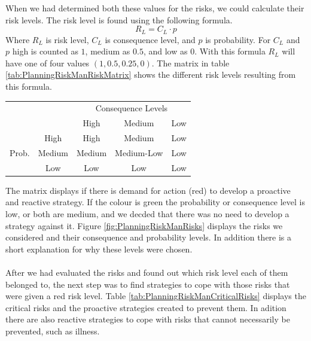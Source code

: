 When we had determined both these values for the risks, we could calculate their risk levels. The risk level is found using the following formula.
\begin{equation}
R_L = C_L \cdot p
\end{equation}
Where \( R_L \) is risk level, \( C_L \) is consequence level, and \( p \) is probability. For \( C_L \) and \( p \) high is counted as \( 1 \), medium as \( 0.5 \), and low as \( 0 \). With this formula \( R_L \) will have one of four values \( (1, 0.5, 0.25, 0) \). The matrix in table \ref{tab:PlanningRiskManRiskMatrix} shows the different risk levels resulting from this formula.

\begin{minipage}{\linewidth}
\centering
\begin{tabular}{cc|c|c|c| }
  \cline{3-5}
  & & \multicolumn{3}{|c|}{Consequence Levels} \\ \cline{3-5}
  & & High & Medium & Low \\ \hline
  \multicolumn{1}{|c}{\multirow{3}{*}{Prob.}} & \multicolumn{1}{|c|}{High} & \cellcolor{red!30} High & \cellcolor{red!30} Medium & \cellcolor{green!15} Low \\ \cline{2-5}
  \multicolumn{1}{|c}{} & \multicolumn{1}{|c|}{Medium} & \cellcolor{red!30} Medium & \cellcolor{green!15} Medium-Low & \cellcolor{green!15} Low \\ \cline{2-5}
  \multicolumn{1}{|c}{} & \multicolumn{1}{|c|}{Low} & \cellcolor{green!15} Low & \cellcolor{green!15} Low & \cellcolor{green!15} Low \\ \cline{2-5}
  \hline
\end{tabular}
\end{minipage}

The matrix displays if there is demand for action (red) to develop a proactive and reactive strategy. If the colour is green the probability or consequence level is low, or both are medium, and we decded that there was no need to develop a strategy against it. Figure \ref{fig:PlanningRiskManRisks} displays the risks we considered and their consequence and probability levels. In addition there is a short explanation for why these levels were chosen.

\paragraph{}After we had evaluated the risks and found out which risk level each of them belonged to, the next step was to find strategies to cope with those risks that were given a red risk level. Table \ref{tab:PlanningRiskManCriticalRisks} displays the critical risks and the proactive strategies created to prevent them. In adition there are also reactive strategies to cope with risks that cannot necessarily be prevented, such as illness.

